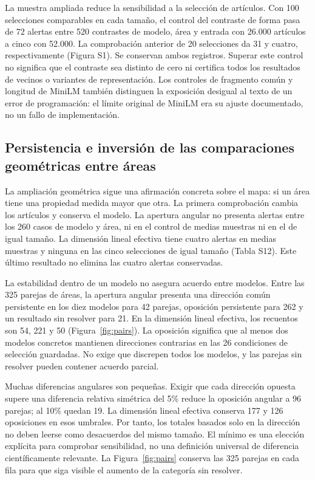 \documentclass[12pt]{article}
\begin{document}
La muestra ampliada reduce la sensibilidad a la selección de artículos. Con 100 selecciones comparables en cada tamaño, el control del contraste de forma pasa de 72 alertas entre 520 contrastes de modelo, área y entrada con 26.000 artículos a cinco con 52.000. La comprobación anterior de 20 selecciones da 31 y cuatro, respectivamente (Figura S1). Se conservan ambos registros. Superar este control no significa que el contraste sea distinto de cero ni certifica todos los resultados de vecinos o variantes de representación. Los controles de fragmento común y longitud de MiniLM también distinguen la exposición desigual al texto de un error de programación: el límite original de MiniLM era su ajuste documentado, no un fallo de implementación.

\subsection{Persistencia e inversión de las comparaciones geométricas entre áreas}
La ampliación geométrica sigue una afirmación concreta sobre el mapa: si un área tiene una propiedad medida mayor que otra. La primera comprobación cambia los artículos y conserva el modelo. La apertura angular no presenta alertas entre los 260 casos de modelo y área, ni en el control de medias muestras ni en el de igual tamaño. La dimensión lineal efectiva tiene cuatro alertas en medias muestras y ninguna en las cinco selecciones de igual tamaño (Tabla S12). Este último resultado no elimina las cuatro alertas conservadas.

La estabilidad dentro de un modelo no asegura acuerdo entre modelos. Entre las 325 parejas de áreas, la apertura angular presenta una dirección común persistente en los diez modelos para 42 parejas, oposición persistente para 262 y un resultado sin resolver para 21. En la dimensión lineal efectiva, los recuentos son 54, 221 y 50 (Figura~\ref{fig:pairs}). La oposición significa que al menos dos modelos concretos mantienen direcciones contrarias en las 26 condiciones de selección guardadas. No exige que discrepen todos los modelos, y las parejas sin resolver pueden contener acuerdo parcial.

Muchas diferencias angulares son pequeñas. Exigir que cada dirección opuesta supere una diferencia relativa simétrica del 5\% reduce la oposición angular a 96 parejas; al 10\% quedan 19. La dimensión lineal efectiva conserva 177 y 126 oposiciones en esos umbrales. Por tanto, los totales basados solo en la dirección no deben leerse como desacuerdos del mismo tamaño. El mínimo es una elección explícita para comprobar sensibilidad, no una definición universal de diferencia científicamente relevante. La Figura~\ref{fig:pairs} conserva las 325 parejas en cada fila para que siga visible el aumento de la categoría sin resolver.
\end{document}
